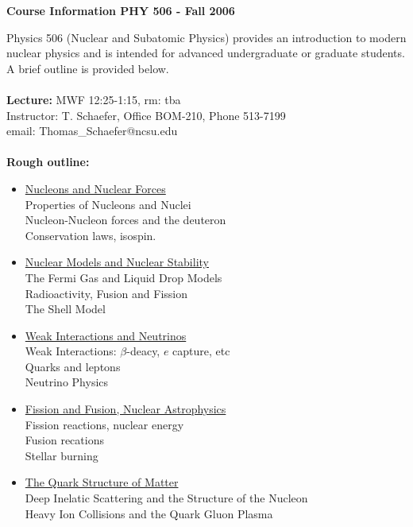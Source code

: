    
\pagestyle{plain}

\centerline{\bf\Large Course Information PHY 506 - Fall 2006}
\vspace*{0.5cm}

 Physics 506 (Nuclear and Subatomic Physics) provides
an introduction to modern nuclear physics and is 
intended for advanced undergraduate or graduate 
students. A brief outline is provided below. \\ \\

\noindent 
{\bf Lecture:} MWF 12:25-1:15, rm: tba\\
 Instructor: T. Schaefer, Office BOM-210, Phone 513-7199\\
 email: Thomas\_Schaefer@ncsu.edu\\ \\


\noindent 
{\bf Rough outline:}
\begin{itemize}

\item{\underline{Nucleons and Nuclear Forces}\\
Properties of Nucleons and Nuclei\\
Nucleon-Nucleon forces and the deuteron\\
Conservation laws, isospin.}
 
\item{\underline{Nuclear Models and Nuclear Stability}\\
The Fermi Gas and Liquid Drop Models\\
Radioactivity, Fusion and Fission\\
The Shell Model}

\item{\underline{Weak Interactions and Neutrinos}\\
Weak Interactions: $\beta$-deacy, $e$ capture, etc\\ 
Quarks and leptons\\ 
Neutrino Physics} 

\item{\underline{Fission and Fusion, Nuclear Astrophysics }\\
Fission reactions, nuclear energy\\
Fusion recations\\
Stellar burning}

\item{\underline{The Quark Structure of Matter}\\
Deep Inelatic Scattering and the Structure of the Nucleon\\
Heavy Ion Collisions and the Quark Gluon Plasma}

\end{itemize}

   
 

 


  

